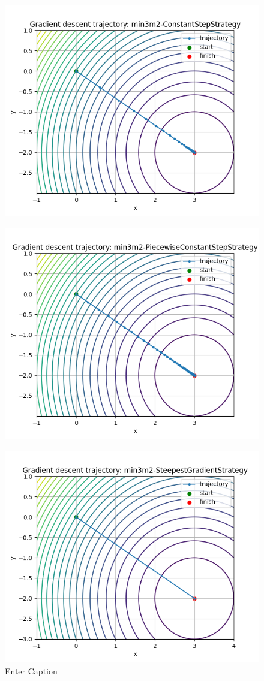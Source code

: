 \documentclass{article}
\begin{document}
\begin{figure}
    \centering
    \includegraphics[width=1\linewidth]{min3m2-ConstantStepStrategy.png}
    \label{fig:enter-label}
\end{figure}
\begin{figure}
    \centering
    \includegraphics[width=1\linewidth]{min3m2-PiecewiseConstantStepStrategy.png}
    \label{fig:enter-label}
\end{figure}
\begin{figure}
    \centering
    \includegraphics[width=0.5\linewidth]{min3m2-SteepestGradientStrategy.png}
    \caption{Enter Caption}
    \label{fig:enter-label}
\end{figure}
\end{document}

